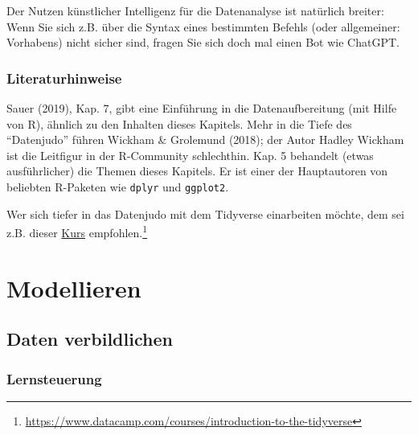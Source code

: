 \documentclass[
  letterpaper,
]{scrbook}
\theoremstyle{definition}
\theoremstyle{definition}
\theoremstyle{definition}
\theoremstyle{remark}
\begin{document}
\begin{tcolorbox}[enhanced jigsaw, colbacktitle=quarto-callout-note-color!10!white, coltitle=black, bottomrule=.15mm, rightrule=.15mm, arc=.35mm, toptitle=1mm, colframe=quarto-callout-note-color-frame, opacitybacktitle=0.6, left=2mm, leftrule=.75mm, breakable, opacityback=0, bottomtitle=1mm, titlerule=0mm, title=\textcolor{quarto-callout-note-color}{\faInfo}\hspace{0.5em}{Hinweis}, colback=white, toprule=.15mm]

Der Nutzen künstlicher Intelligenz für die Datenanalyse ist natürlich
breiter: Wenn Sie sich z.B. über die Syntax eines bestimmten Befehls
(oder allgemeiner: Vorhabens) nicht sicher sind, fragen Sie sich doch
mal einen Bot wie ChatGPT.

\end{tcolorbox}

\section{Literaturhinweise}\label{literaturhinweise-2}

Sauer (2019), Kap. 7, gibt eine Einführung in die Datenaufbereitung (mit
Hilfe von R), ähnlich zu den Inhalten dieses Kapitels. Mehr in die Tiefe
des ``Datenjudo'' führen Wickham \& Grolemund (2018); der Autor Hadley
Wickham ist die Leitfigur in der R-Community schlechthin. Kap. 5
behandelt (etwas ausführlicher) die Themen dieses Kapitels. Er ist einer
der Hauptautoren von beliebten R-Paketen wie \texttt{dplyr} und
\texttt{ggplot2}.

Wer sich tiefer in das Datenjudo mit dem Tidyverse einarbeiten möchte,
dem sei z.B. dieser
\href{https://www.datacamp.com/courses/introduction-to-the-tidyverse}{Kurs}
empfohlen.\footnote{\url{https://www.datacamp.com/courses/introduction-to-the-tidyverse}}

\part{Modellieren}

\chapter{Daten verbildlichen}\label{daten-verbildlichen}

\section{Lernsteuerung}\label{lernsteuerung-3}
\end{document}
